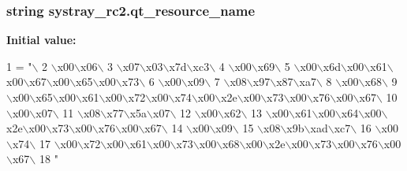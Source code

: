 \subsubsection[{qt\+\_\+resource\+\_\+name}]{\setlength{\rightskip}{0pt plus 5cm}string systray\+\_\+rc2.\+qt\+\_\+resource\+\_\+name}\label{namespacesystray__rc2_a3bf24cc2580c62f8faa56074f224e683}
{\bfseries Initial value\+:}
\begin{DoxyCode}
1 = \textcolor{stringliteral}{"\(\backslash\)}
2 \textcolor{stringliteral}{\(\backslash\)x00\(\backslash\)x06\(\backslash\)}
3 \textcolor{stringliteral}{\(\backslash\)x07\(\backslash\)x03\(\backslash\)x7d\(\backslash\)xc3\(\backslash\)}
4 \textcolor{stringliteral}{\(\backslash\)x00\(\backslash\)x69\(\backslash\)}
5 \textcolor{stringliteral}{\(\backslash\)x00\(\backslash\)x6d\(\backslash\)x00\(\backslash\)x61\(\backslash\)x00\(\backslash\)x67\(\backslash\)x00\(\backslash\)x65\(\backslash\)x00\(\backslash\)x73\(\backslash\)}
6 \textcolor{stringliteral}{\(\backslash\)x00\(\backslash\)x09\(\backslash\)}
7 \textcolor{stringliteral}{\(\backslash\)x08\(\backslash\)x97\(\backslash\)x87\(\backslash\)xa7\(\backslash\)}
8 \textcolor{stringliteral}{\(\backslash\)x00\(\backslash\)x68\(\backslash\)}
9 \textcolor{stringliteral}{\(\backslash\)x00\(\backslash\)x65\(\backslash\)x00\(\backslash\)x61\(\backslash\)x00\(\backslash\)x72\(\backslash\)x00\(\backslash\)x74\(\backslash\)x00\(\backslash\)x2e\(\backslash\)x00\(\backslash\)x73\(\backslash\)x00\(\backslash\)x76\(\backslash\)x00\(\backslash\)x67\(\backslash\)}
10 \textcolor{stringliteral}{\(\backslash\)x00\(\backslash\)x07\(\backslash\)}
11 \textcolor{stringliteral}{\(\backslash\)x08\(\backslash\)x77\(\backslash\)x5a\(\backslash\)x07\(\backslash\)}
12 \textcolor{stringliteral}{\(\backslash\)x00\(\backslash\)x62\(\backslash\)}
13 \textcolor{stringliteral}{\(\backslash\)x00\(\backslash\)x61\(\backslash\)x00\(\backslash\)x64\(\backslash\)x00\(\backslash\)x2e\(\backslash\)x00\(\backslash\)x73\(\backslash\)x00\(\backslash\)x76\(\backslash\)x00\(\backslash\)x67\(\backslash\)}
14 \textcolor{stringliteral}{\(\backslash\)x00\(\backslash\)x09\(\backslash\)}
15 \textcolor{stringliteral}{\(\backslash\)x08\(\backslash\)x9b\(\backslash\)xad\(\backslash\)xc7\(\backslash\)}
16 \textcolor{stringliteral}{\(\backslash\)x00\(\backslash\)x74\(\backslash\)}
17 \textcolor{stringliteral}{\(\backslash\)x00\(\backslash\)x72\(\backslash\)x00\(\backslash\)x61\(\backslash\)x00\(\backslash\)x73\(\backslash\)x00\(\backslash\)x68\(\backslash\)x00\(\backslash\)x2e\(\backslash\)x00\(\backslash\)x73\(\backslash\)x00\(\backslash\)x76\(\backslash\)x00\(\backslash\)x67\(\backslash\)}
18 \textcolor{stringliteral}{"}
\end{DoxyCode}
\hypertarget{namespacesystray__rc2_a5adb2d10a74353ba4c5777da348e1fdc}{}
